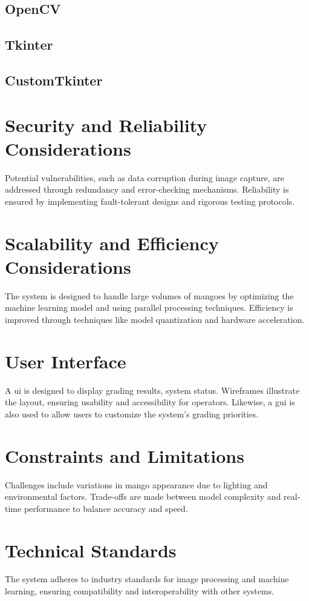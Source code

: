 \subsection{OpenCV}

\subsection{Tkinter}

\subsection{CustomTkinter}

\section{Security and Reliability Considerations}
Potential vulnerabilities, such as data corruption during image capture, are addressed through redundancy and error-checking mechanisms. Reliability is ensured by implementing fault-tolerant designs and rigorous testing protocols.

\section{Scalability and Efficiency Considerations}
The system is designed to handle large volumes of mangoes by optimizing the machine learning model and using parallel processing techniques. Efficiency is improved through techniques like model quantization and hardware acceleration.

\section{User Interface}
A \gls{ui} is designed to display grading results, system status. Wireframes illustrate the layout, ensuring usability and accessibility for operators. 
Likewise, a \gls{gui} is also used to allow users to customize the system's grading priorities.

\section{Constraints and Limitations}
Challenges include variations in mango appearance due to lighting and environmental factors. Trade-offs are made between model complexity and real-time performance to balance accuracy and speed.

\section{Technical Standards}
The system adheres to industry standards for image processing and machine learning, ensuring compatibility and interoperability with other systems.

